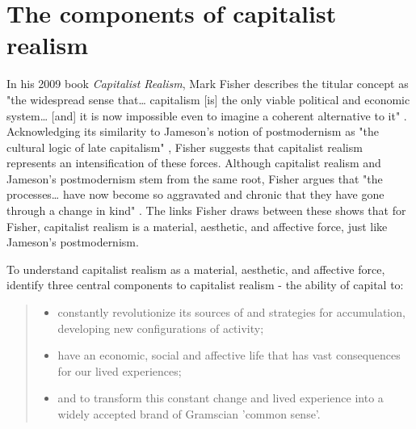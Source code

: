 \section{The components of capitalist realism}
\label{sec:2-components}

In his 2009 book \emph{Capitalist Realism}, Mark Fisher describes the titular concept as "the widespread sense that\ldots{} capitalism [is] the only viable political and economic system\ldots{} [and]
it is now impossible even to imagine a coherent alternative to it" \citep[2]{fisher_capitalist_2009}. Acknowledging its similarity to Jameson's notion of postmodernism as "the cultural logic of late capitalism" \cite{jameson_postmodernism_1991}, Fisher suggests that capitalist realism represents an intensification of these forces. Although capitalist realism and Jameson's postmodernism stem from the same root, Fisher argues that "the processes\ldots{} have now become so aggravated and chronic that they have gone through a change in kind" \cite[7]{fisher_capitalist_2009}. The links Fisher draws between these shows that for Fisher, capitalist realism is a material, aesthetic, and affective force, just like Jameson's postmodernism. 

To understand capitalist realism as a material, aesthetic, and affective force, \citet[6]{shonkwiler_reading_2014} identify three central components to capitalist realism - the ability of capital to:
\begin{quote}
\begin{itemize}
\item  constantly revolutionize its sources of and strategies for accumulation, developing new configurations of activity;
\item   have an economic, social and affective life that has vast consequences for our lived experiences;
\item  and to transform this constant change and lived experience into a widely accepted brand of Gramscian 'common sense'.
\end{itemize}
\end{quote}

